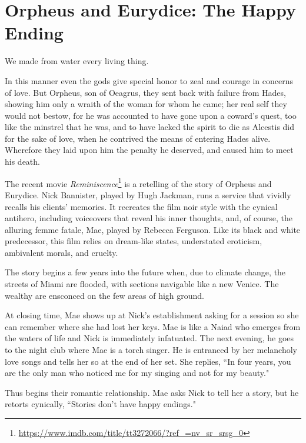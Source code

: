 \section{Orpheus and Eurydice: The Happy Ending}

\begin{quotex}
We made from water every living thing.

In this manner even the gods give special honor to zeal and courage in concerns of love. But Orpheus, son of Oeagrus, they sent back with failure from Hades, showing him only a wraith of the woman for whom he came; her real self they would not bestow, for he was accounted to have gone upon a coward's quest, too like the minstrel that he was, and to have lacked the spirit to die as Alcestis did for the sake of love, when he contrived the means of entering Hades alive. Wherefore they laid upon him the penalty he deserved, and caused him to meet his death. 

\end{quotex}

The recent movie \emph{Reminiscence}\footnote{\url{https://www.imdb.com/title/tt3272066/?ref_=nv_sr_srsg_0}} is a retelling of the story of Orpheus and Eurydice. Nick Bannister, played by Hugh Jackman, runs a service that vividly recalls his clients' memories. It recreates the film noir style with the cynical antihero, including voiceovers that reveal his inner thoughts, and, of course, the alluring femme fatale, Mae, played by Rebecca Ferguson. Like its black and white predecessor, this film relies on dream-like states, understated eroticism, ambivalent morals, and cruelty.

The story begins a few years into the future when, due to climate change, the streets of Miami are flooded, with sections navigable like a new Venice. The wealthy are ensconced on the few areas of high ground.

At closing time, Mae shows up at Nick's establishment asking for a session so she can remember where she had lost her keys. Mae is like a Naiad who emerges from the waters of life and Nick is immediately infatuated. The next evening, he goes to the night club where Mae is a torch singer. He is entranced by her melancholy love songs and tells her so at the end of her set. She replies, ``In four years, you are the only man who noticed me for my singing and not for my beauty."

Thus begins their romantic relationship. Mae asks Nick to tell her a story, but he retorts cynically, ``Stories don't have happy endings."

